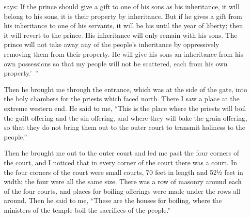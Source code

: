 {{}
says: If
the prince
should give
a gift
to one
of his sons
as his inheritance,
it
will belong to his sons,
it is
their property
by inheritance.
But if
he gives
a gift
from his inheritance
to one
of his servants,
it will be
his until
the year
of liberty;
then it will revert
to the prince.
His inheritance
will only
remain with his sons.
The prince
will not
take
away any of the people’s
inheritance
by oppressively
removing them from their property.
He will give his sons
an inheritance
from his own possessions
so that
my people
will not
be scattered,
each
from his own property.’ ”
\par }{\PP {}Then he brought
me through the entrance,
which
was at the side
of the gate,
into
the holy
chambers
for the priests
which faced
north.
There
I saw
a place
at the extreme
western end.
He said
to
me, “This
is the place
where
the priests
will boil
the guilt offering
and the sin offering,
and where
they will bake
the
grain offering,
so that they do not
bring
them out
to
the outer
court
to transmit holiness
to the
people.”
\par }{\PP {}Then he brought
me out
to
the outer
court
and led
me past
the four
corners
of the court,
and I noticed
that in every corner
of the court
there was a court.
In the four
corners
of the court
were small courts,
70 feet
in length
and 52½ feet
in width;
the four
were all the same
size.
There was a row
of masonry around
each
of the four
courts, and places for boiling
offerings were made
under
the rows
all around.
Then he said
to me,
“These
are the houses
for boiling,
where
the ministers
of the temple
boil
the sacrifices
of the people.”

}

